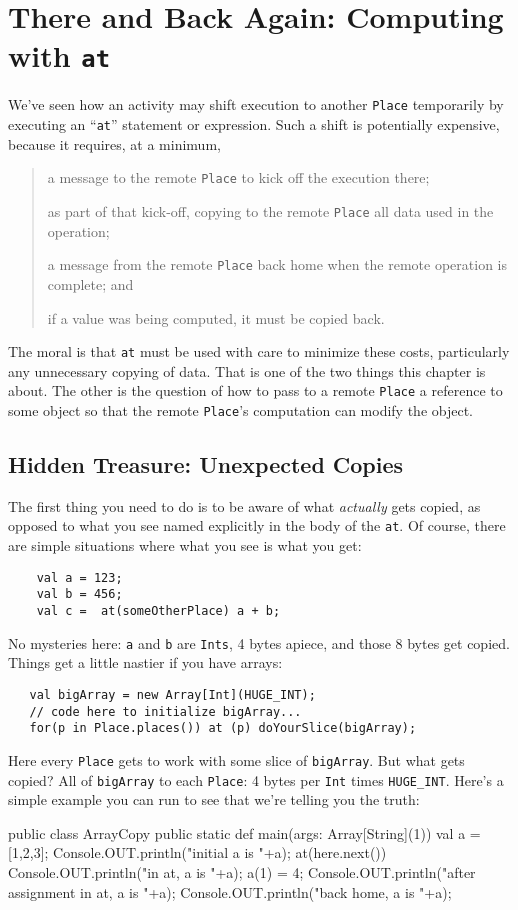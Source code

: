 
\chapter{There and Back Again: Computing with {\tt at}}

We've seen how an activity may shift execution to another {\tt Place}
temporarily by executing an ``{\tt at}'' statement or expression.  Such a shift
is potentially expensive, because it requires, at a minimum,
\begin{quote}
a message to the remote {\tt Place} to kick off the execution there;

as part of that kick-off, copying to the remote {\tt Place} all data used in the
operation;

a message from the remote {\tt Place} back home when the remote operation is
complete; and

if a value was being computed, it must be copied back.
\end{quote}

The moral is that {\tt at} must be used with care to minimize these costs,
particularly any unnecessary copying of data.  That is one of the two things
this chapter is about.  The other is the question of how
to pass to a remote {\tt Place} a reference to some object so that the
remote {\tt Place}'s computation can modify the object.

\section{Hidden Treasure: Unexpected Copies}\label{sec:hidden-treasure}

The first thing you need to do is to be aware of what {\em actually} gets
copied, as opposed to what you see named explicitly in the body of the {\tt at}.
Of course, there are simple situations where what you see is what you get:
\begin{verbatim}
    val a = 123;
    val b = 456;
    val c =  at(someOtherPlace) a + b;
\end{verbatim}
No mysteries here: {\tt a} and {\tt b} are {\tt Ints}, 4 bytes apiece, and those
8 bytes get copied.  Things get a little nastier if you have arrays:

\begin{verbatim}
   val bigArray = new Array[Int](HUGE_INT);
   // code here to initialize bigArray...
   for(p in Place.places()) at (p) doYourSlice(bigArray);
\end{verbatim}
Here every {\tt Place} gets to work with some slice of {\tt bigArray}. But what
gets copied?  All of {\tt bigArray} to each {\tt Place}: 4 bytes per {\tt Int}
times {\tt HUGE\_INT}.  Here's a simple example you can run to see that we're
telling you the truth:
\begin{xtennum}[]
public class ArrayCopy {
   public static def main(args: Array[String](1)) {
      val a = [1,2,3];
      Console.OUT.println("initial a is "+a);
      at(here.next()) {
         Console.OUT.println("in at, a is "+a);
         a(1) = 4;                              
         Console.OUT.println("after assignment in at, a is "+a); 
      }
      Console.OUT.println("back home, a is "+a); 
   }
}
\end{xtennum}
